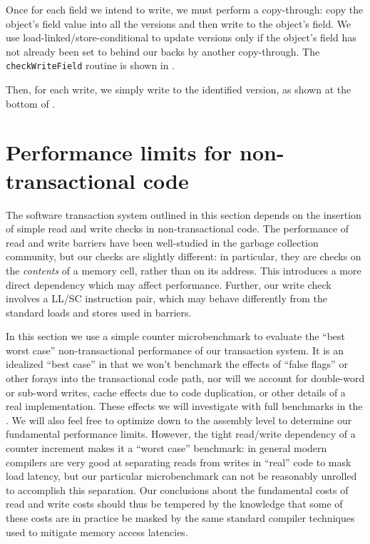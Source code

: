 Once for each field we intend to write, we must perform a
copy-through: copy the object's field value into all the versions and
then write \FLAG to the object's field.  We use
load-linked/store-conditional to update versions only if the object's
field has not already been set to \FLAG behind our backs by another
copy-through.  The {\tt checkWriteField} routine is shown in
.

Then, for each write, we simply write to the identified version, as
shown at the bottom of .

\section{Performance limits for non-transactional code}
\label{sec:counter-bench}
The software transaction system outlined in this section depends on
the insertion of simple read and write checks in non-transactional
code.  The performance of read and write barriers have been
well-studied in the garbage collection community, but our checks are
slightly different: in particular, they are checks on the
\textit{contents} of a memory cell, rather than on its address.  This
introduces a more direct dependency which may affect performance.
Further, our write check involves a LL/SC instruction pair, which may
behave differently from the standard loads and stores used in
barriers.

In this section we use a simple counter microbenchmark to evaluate the
``best worst case'' non-transactional performance of our transaction
system.  It is an idealized ``best case'' in that we won't benchmark
the effects of ``false flags'' or other forays into the transactional
code path, nor will we account for double-word or sub-word writes,
cache effects due to code duplication, or other details of a real
implementation.  These effects we will investigate with full
benchmarks in the .  We will also feel free to
optimize down to the assembly level to determine our fundamental
performance limits.  However, the tight read/write dependency of a
counter increment makes it a ``worst case'' benchmark: in general
modern compilers are very good at separating reads from writes in
``real'' code to mask load latency, but our particular microbenchmark
can not be reasonably unrolled to accomplish this separation.  Our
conclusions about the fundamental costs of read and write costs should
thus be tempered by the knowledge that some of these costs are in
practice be masked by the same standard compiler techniques used to
mitigate memory access latencies.

